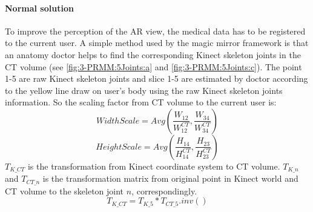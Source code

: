 \paragraph{Normal solution} To improve the perception of the AR view, the medical data has to be registered to the current user. A simple method used by the magic mirror framework is that an anatomy doctor helps to find the corresponding Kinect skeleton joints in the CT volume (see \figurename{\ref{fig:3-PRMM:5Joints:a}} and \figurename{\ref{fig:3-PRMM:5Joints:c}}). The point 1-5 are raw Kinect skeleton joints and slice 1-5 are estimated by doctor according to the yellow line draw on user's body using the raw Kinect skeleton joints information. So the scaling factor from CT volume to the current user is:
\begin{equation}
	WidthScale = Avg(\frac{{{W_{12}}}}{{W_{12}^{CT}}},\frac{{{W_{34}}}}{{W_{34}^{CT}}})
\end{equation}
\begin{equation}
	HeightScale = Avg(\frac{{{H_{14}}}}{{H_{14}^{CT}}},\frac{{{H_{23}}}}{{H_{23}^{CT}}})
\end{equation}
$T_{K\_CT}$ is the transformation from Kinect coordinate system to CT volume. $T_{K\_n}$ and $T_{CT\_n}$ is the transformation matrix from original point in Kinect world and CT volume to the skeleton joint $n$, correspondingly.
\begin{equation}
	T_{K\_CT} = T_{K\_5} * T_{CT\_5}.inv()
\end{equation}
